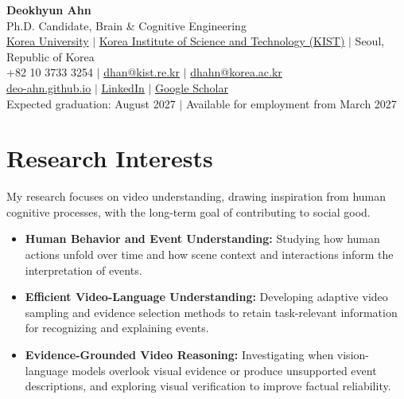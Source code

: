 \documentclass[letterpaper,11pt]{article}
\newcommand{\resumeItem}[1]{\item\small{#1\vspace{-2pt}}}
\newcommand{\resumeItemListStart}{\begin{itemize}[leftmargin=0.18in,label=\textbullet,itemsep=2pt,topsep=5pt]}
\newcommand{\resumeItemListEnd}{\end{itemize}\vspace{-5pt}}
\newcommand{\resumeParagraph}[1]{{\small #1\par}\vspace{5pt}}
\begin{document}
\begin{center}
  \textbf{\Huge Deokhyun Ahn} \\ \vspace{3pt}
  \small Ph.D. Candidate, Brain \& Cognitive Engineering \\
  \href{https://bce.korea.ac.kr/bce/index.do}{Korea University}
  $|$ \href{https://www.kist.re.kr/}{Korea Institute of Science and Technology (KIST)}
  $|$ Seoul, Republic of Korea \\ \vspace{3pt}
  +82 10 3733 3254 $|$
  \href{mailto:dhan@kist.re.kr}{\underline{dhan@kist.re.kr}} $|$
  \href{mailto:dhahn@korea.ac.kr}{\underline{dhahn@korea.ac.kr}} \\
  \href{https://deo-ahn.github.io/}{\underline{deo-ahn.github.io}} $|$
  \href{https://www.linkedin.com/in/deokhyun-ahn/}{\underline{LinkedIn}} $|$
  \href{https://scholar.google.com/citations?user=5VDH7PgAAAAJ&hl=ko}{\underline{Google Scholar}} \\ \vspace{3pt}
  Expected graduation: August 2027 $|$ Available for employment from March 2027
\end{center}

\section{Research Interests}
\resumeParagraph{My research focuses on video understanding, drawing inspiration from human cognitive processes, with the long-term goal of contributing to social good.}
\resumeItemListStart
  \resumeItem{\textbf{Human Behavior and Event Understanding:} Studying how human actions unfold over time and how scene context and interactions inform the interpretation of events.}
  \resumeItem{\textbf{Efficient Video-Language Understanding:} Developing adaptive video sampling and evidence selection methods to retain task-relevant information for recognizing and explaining events.}
  \resumeItem{\textbf{Evidence-Grounded Video Reasoning:} Investigating when vision-language models overlook visual evidence or produce unsupported event descriptions, and exploring visual verification to improve factual reliability.}
\resumeItemListEnd

\end{document}
